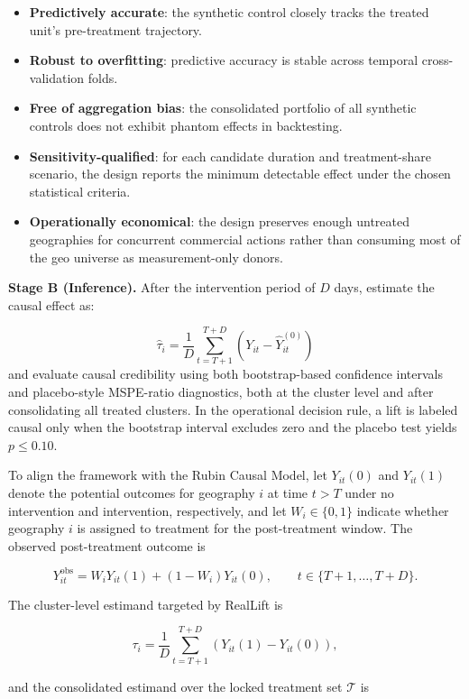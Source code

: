 \documentclass[11pt]{article}
\begin{document}
\begin{itemize}
\item \textbf{Predictively accurate}: the synthetic control closely tracks the treated unit's pre-treatment trajectory.
\item \textbf{Robust to overfitting}: predictive accuracy is stable across temporal cross-validation folds.
\item \textbf{Free of aggregation bias}: the consolidated portfolio of all synthetic controls does not exhibit phantom effects in backtesting.
\item \textbf{Sensitivity-qualified}: for each candidate duration and treatment-share scenario, the design reports the minimum detectable effect under the chosen statistical criteria.
\item \textbf{Operationally economical}: the design preserves enough untreated geographies for concurrent commercial actions rather than consuming most of the geo universe as measurement-only donors.
\end{itemize}

\textbf{Stage B (Inference).} After the intervention period of $D$ days, estimate the causal effect as:

\[
\hat{\tau}_i = \frac{1}{D} \sum_{t=T+1}^{T+D} \left( Y_{it} - \hat{Y}_{it}^{(0)} \right)
\]
and evaluate causal credibility using both bootstrap-based confidence intervals and placebo-style MSPE-ratio diagnostics, both at the cluster level and after consolidating all treated clusters. In the operational decision rule, a lift is labeled causal only when the bootstrap interval excludes zero and the placebo test yields $p \leq 0.10$.

To align the framework with the Rubin Causal Model, let $Y_{it}(0)$ and $Y_{it}(1)$ denote the potential outcomes for geography $i$ at time $t > T$ under no intervention and intervention, respectively, and let $W_i \in \{0,1\}$ indicate whether geography $i$ is assigned to treatment for the post-treatment window. The observed post-treatment outcome is

\[
Y_{it}^{\mathrm{obs}} = W_i Y_{it}(1) + (1 - W_i) Y_{it}(0), \qquad t \in \{T+1, \ldots, T+D\}.
\]

The cluster-level estimand targeted by RealLift is

\[
\tau_i = \frac{1}{D} \sum_{t=T+1}^{T+D} \left( Y_{it}(1) - Y_{it}(0) \right),
\]

and the consolidated estimand over the locked treatment set $\mathcal{T}$ is
\end{document}
